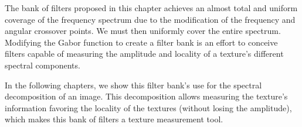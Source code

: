 The bank of filters proposed in this chapter achieves an almost total and uniform coverage of the frequency spectrum due to the modification of the frequency and angular crossover points.
We must then uniformly cover the entire spectrum. Modifying the Gabor function to create a filter bank is an effort to conceive filters capable of measuring the amplitude and locality of a texture's different spectral components. 

In the following chapters, we show this filter bank's use for the spectral decomposition of an image. This decomposition allows measuring the texture's information favoring the locality of the textures (without losing the amplitude), which makes this bank of filters a texture measurement tool.
